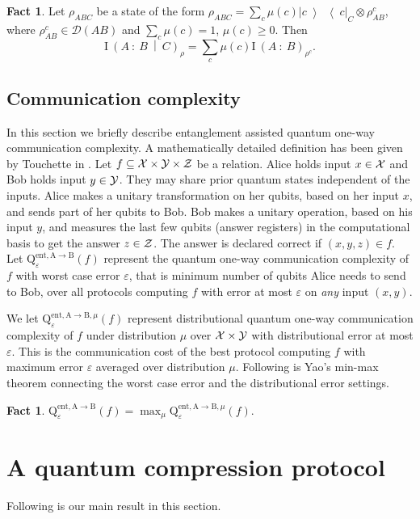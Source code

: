 \documentclass[11pt,a4paper]{article}
\def\X{\CMcal{X}}
\def\Y{\CMcal{Y}}
\def\Z{\CMcal{Z}}
\theoremstyle{plain}
\theoremstyle{definition}
\newtheorem{fact}[theorem]{Fact}
\newcommand {\br} [1] {\ensuremath{ \left( #1 \right) }}
\newcommand {\minusspace} {\: \! \!}
\newcommand {\smallspace} {\: \!}
\newcommand {\fn} [2] {\ensuremath{ #1 \minusspace \br{ #2 } }}
\newcommand {\mutinf} [2] {\fn{\mathrm{I}}{#1 \smallspace : \smallspace #2}}
\newcommand {\condmutinf} [3] {\mutinf{#1}{#2 \smallspace \middle\vert \smallspace #3}}
\newcommand {\ketbratwo} [2] {\ensuremath{ \left| #1 \middle\rangle \middle\langle #2 \right| }}
\newcommand {\ketbra} [1] {\ketbratwo{#1}{#1}}
\def\ve{{\varepsilon}}
\newcommand{\qcc}[2]{\mathrm{Q}^{\text{ent},\text{A}\rightarrow\text{B}}_{#1}\br{#2}}
\newcommand{\dqcc}[3]{\mathrm{Q}^{\text{ent},\text{A}\rightarrow\text{B} #1}_{#2}\br{#3}}
\begin{document}
\begin{fact}
\label{fact:cqcondmut}
Let $\rho_{ABC}$ be a state of the form $\rho_{ABC}=\sum_c \mu(c)\ketbra{c}_{C}\otimes \rho^c_{AB}$, where $\rho^c_{AB}\in\mathcal{D}(AB)$ and $\sum_c\mu(c)=1$, $\mu(c)\geq 0$. Then
$$\condmutinf{A}{B}{C}_{\rho}=\sum_c \mu(c)\mutinf{A}{B}_{\rho^c}.$$
\end{fact}

\subsection*{Communication complexity}
In this section we briefly describe entanglement assisted quantum one-way communication complexity. A mathematically detailed definition has been given by Touchette in \cite{Touchette:2014}. Let $f\subseteq\X\times\Y\times\Z$ be a relation. Alice holds input $x \in \X$ and Bob holds input $y \in \Y$. They may share prior quantum states independent of the inputs. Alice makes a unitary transformation on her qubits, based on her input $x$, and sends part of her qubits to Bob. Bob makes a unitary operation, based on his input $y$, and measures the last few qubits (answer registers) in the computational basis to get the answer $z \in \Z$. The answer is declared correct if $(x,y,z)\in f$. Let $\qcc{\ve}{f}$ represent the quantum one-way communication complexity of $f$ with worst case error $\ve$, that is minimum number of qubits Alice needs to send to Bob, over all protocols computing $f$ with error at most $\ve$ on \textit{any} input $(x,y)$. 


We let $\dqcc{, \mu}{\ve}{f}$ represent distributional quantum one-way communication complexity of $f$ under distribution $\mu$ over $\X\times \Y$ with distributional error at most $\ve$. This is the communication cost of the best protocol computing $f$ with maximum error $\ve$ averaged over distribution $\mu$. Following is Yao's min-max theorem connecting the worst case error and the distributional error settings.

\begin{fact}\label{fact:yaos principle}\cite{Yao:1979:CQR:800135.804414}
$\qcc{\ve}{f}=\max_{\mu}\dqcc{, \mu}{\ve}{f}$.
\end{fact}

\section{A quantum compression protocol}
\label{sec:main}
Following is our main result in this section.
\end{document}

